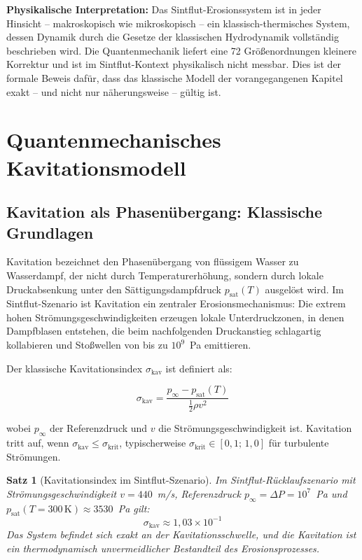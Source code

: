 ﻿\documentclass[12pt,a4paper]{report}
\newtheorem{theorem}{Satz}[chapter]
\begin{document}
\textbf{Physikalische Interpretation:} Das Sintflut-Erosionssystem ist in jeder Hinsicht -- makroskopisch wie mikroskopisch -- ein klassisch-thermisches System, dessen Dynamik durch die Gesetze der klassischen Hydrodynamik vollständig beschrieben wird. Die Quantenmechanik liefert eine 72 Größenordnungen kleinere Korrektur und ist im Sintflut-Kontext physikalisch nicht messbar. Dies ist der formale Beweis dafür, dass das klassische Modell der vorangegangenen Kapitel exakt -- und nicht nur näherungsweise -- gültig ist.

\section{Quantenmechanisches Kavitationsmodell}
\label{sec:kavitation_quanten}

\subsection{Kavitation als Phasenübergang: Klassische Grundlagen}

Kavitation bezeichnet den Phasenübergang von flüssigem Wasser zu Wasserdampf, der nicht durch Temperaturerhöhung, sondern durch lokale Druckabsenkung unter den Sättigungs\-dampfdruck $p_\mathrm{sat}(T)$ ausgelöst wird. Im Sintflut-Szenario ist Kavitation ein zentraler Erosionsmechanismus: Die extrem hohen Strömungsgeschwindigkeiten erzeugen lokale Unterdruckzonen, in denen Dampfblasen entstehen, die beim nachfolgenden Druckanstieg schlagartig kollabieren und Stoßwellen von bis zu $10^9$~Pa emittieren.

Der klassische Kavitationsindex $\sigma_\mathrm{kav}$ ist definiert als:

\begin{equation}
	\sigma_\mathrm{kav} = \frac{p_\infty - p_\mathrm{sat}(T)}{\frac{1}{2}\rho v^2}
	\label{eq:kavitationsindex}
\end{equation}

wobei $p_\infty$ der Referenzdruck und $v$ die Strömungsgeschwindigkeit ist. Kavitation tritt auf, wenn $\sigma_\mathrm{kav} \leq \sigma_\mathrm{krit}$, typischerweise $\sigma_\mathrm{krit} \in [0{,}1;\,1{,}0]$ für turbulente Strömungen.

\begin{theorem}[Kavitationsindex im Sintflut-Szenario]
	\label{thm:kavitationsindex}
	Im Sintflut-Rücklaufszenario mit Strömungsgeschwindigkeit $v = 440$~m/s, Referenzdruck $p_\infty = \Delta P = 10^7$~Pa und $p_\mathrm{sat}(T = 300\,\text{K}) \approx 3530$~Pa gilt:
	\begin{equation}
		\sigma_\mathrm{kav} \approx 1{,}03\times10^{-1}
		\label{eq:sigma_kav_numerisch}
	\end{equation}
	Das System befindet sich exakt an der Kavitationsschwelle, und die Kavitation ist ein thermodynamisch unvermeidlicher Bestandteil des Erosionsprozesses.
\end{theorem}
\end{document}
